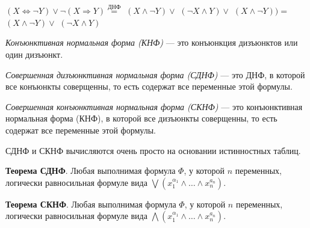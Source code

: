 \ex $(X \Leftrightarrow \lnot Y) \lor \lnot (X \Rightarrow Y) \overset {\text{ДНФ}}{=}$ $(X \land \lnot Y) \lor$ $(\lnot X \land Y) \lor$ $(X \land \lnot Y)) =$ $(X \land \lnot Y) \lor$ $(\lnot X \land Y)$

\dftion \textit{Конъюнктивная нормальная форма (КНФ)} --- это конъюнкция дизъюнктов или один дизъюнкт.

\dftion \textit{Совершенная дизъюнктивная нормальная форма (СДНФ)} --- это ДНФ, в которой все конъюнкты соверщенны, то есть содержат все переменные этой формулы.

\dftion \textit{Совершенная конъюнктивная нормальная форма (СКНФ)} --- это конъюнктивная нормальная форма (КНФ), в которой все дизъюнкты соверщенны, то есть содержат все переменные этой формулы.

СДНФ и СКНФ вычисляются очень просто на основании истинностных таблиц.

\textbf{Теорема СДНФ}. Любая выполнимая формула $\Phi$, у которой $n$ переменных, логически равносильная формуле вида $\bigvee(x_1^{\alpha_1} \land \dots \land x_n^{a_n})$.

\textbf{Теорема СКНФ}. Любая выполнимая формула $\Phi$, у которой $n$ переменных, логически равносильная формуле вида $\bigwedge(x_1^{\alpha_1} \land \dots \land x_n^{a_n})$.